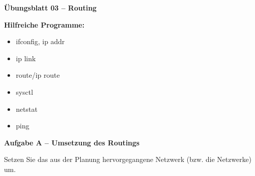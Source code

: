 \documentclass[paper=a4,fontsize=11pt]{scrartcl}%
\numberwithin{equation}{section}
\begin{document}
\begin{center}
\Large{\textbf{Übungsblatt 03 -- Routing}}
\end{center}
\textbf{Hilfreiche Programme:}
\begin{multicols}{3}
\begin{itemize}
	\item ifconfig, ip addr
	\item ip link
	\item route/ip route
	\item sysctl
	\item netstat 
	\item ping
\end{itemize}
\end{multicols}
	
\begin{center}\Large{\textbf{Aufgabe A -- Umsetzung des Routings}}\end{center}\vskip0.25in
Setzen Sie das aus der Planung hervorgegangene Netzwerk (bzw. die Netzwerke) um.
\end{document}
